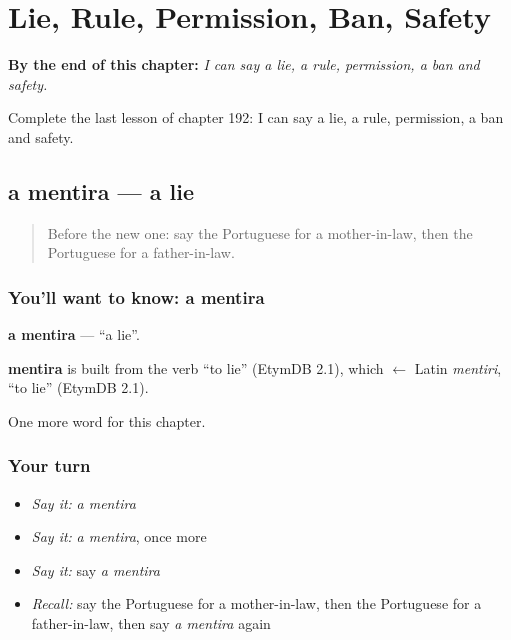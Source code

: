 
\chapter{Lie, Rule, Permission, Ban, Safety}
\label{ch:pt-lie-rule-permission-ban-safety}

\begin{chapteropening}
\textbf{By the end of this chapter:} \emph{I can say a lie, a rule, permission, a ban and safety.}

Complete the last lesson of chapter 192: I can say a lie, a rule, permission, a ban and safety.
\end{chapteropening}

\section[a mentira]{a mentira — a lie}

\label{lesson:PT-C192-mentira}



\begin{quote}
Before the new one: say the Portuguese for a mother-in-law, then the Portuguese for a father-in-law.
\end{quote}

\subsection*{You'll want to know: a mentira}
\textbf{a mentira} — \textquotedblleft{}a lie\textquotedblright{}.

\begin{cousinweb}
\textbf{mentira} is built from the verb \textquotedblleft{}to lie\textquotedblright{} (EtymDB 2.1), which $\leftarrow$ Latin \emph{mentiri}, \textquotedblleft{}to lie\textquotedblright{} (EtymDB 2.1).
\end{cousinweb}

\begin{grammarlens}[title={What you've built}]
One more word for this chapter.
\end{grammarlens}

\subsection*{Your turn}
\begin{itemize}
\raggedright
  \item \emph{Say it:} \emph{a mentira}
  \item \emph{Say it:} \emph{a mentira}, once more
  \item \emph{Say it:} say \emph{a mentira}
  \item \emph{Recall:} say the Portuguese for a mother-in-law, then the Portuguese for a father-in-law, then say \emph{a mentira} again
\end{itemize}

